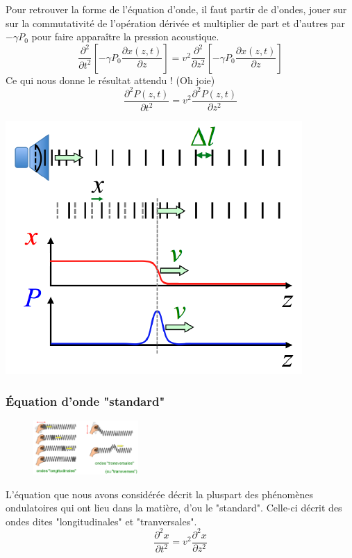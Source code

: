 \documentclass	[11pt, a4paper, openany]{book}
\begin{document}
Pour retrouver la forme de l'équation d'onde, il faut partir de d'ondes, jouer sur sur la commutativité de l'opération dérivée et multiplier de part et d'autres par $-\gamma P_0$ pour faire apparaître la pression acoustique.
\begin{equation}
\frac{\partial^2}{\partial t^2}\left[-\gamma P_0\frac{\partial x(z, t)}{\partial z}\right] = v^2 \frac{\partial^2}{\partial z^2}\left[-\gamma P_0\frac{\partial x(z, t)}{\partial z}\right]
\end{equation}
Ce qui nous donne le résultat attendu ! (Oh joie)
\begin{equation}
\frac{\partial^2 P(z,t)}{\partial t^2} = v^2 \frac{\partial^2 P(z,t)}{\partial z^2}
\end{equation}
\begin{center}
\includegraphics[scale=0.4]{oo/image30.png}
\end{center}
\subsubsection{Équation d'onde "standard"}
\begin{figure}
\includegraphics[width=4cm]{oo/image31.png}
\end{figure}
L'équation que nous avons considérée décrit la pluspart des phénomènes ondulatoires qui ont lieu dans la matière, d'ou le "standard". Celle-ci décrit des ondes dites "longitudinales" et "tranversales".
\begin{equation}
\frac{\partial^2 x}{\partial t^2} = v^2 \frac{\partial^2 x}{\partial z^2}
\end{equation}
\end{document}
